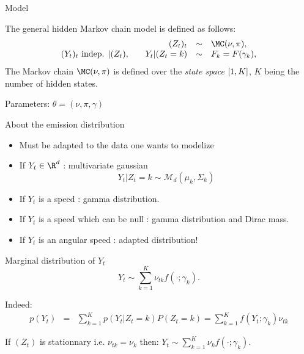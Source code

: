 \documentclass[compress,10pt]{beamer}
\begin{document}
\begin{frame}{Model}
 

\begin{definition} \label{Def:HMM}
  The general hidden Markov chain model is defined as follows:
  \begin{equation} \label{Eq:HMM}
  \begin{array}{rcrcl}
  & & (Z_t)_t & \sim & \MC(\nu, \pi),
  \\
  (Y_t)_t \text{ indep. } | (Z_t), & &
  Y_t | (Z_t = k) & \sim & F_k = F(\gamma_k),
  \end{array}
  \end{equation}
  The Markov chain $\MC(\nu, \pi)$ is defined over the {\sl state space} $\interval{1}{K}$, $K$ being the number of hidden states. 
\end{definition}


\textcolor{dgreen}{Parameters}: $\theta = (\nu, \pi, \gamma)$
\end{frame}



\begin{frame}{About the emission distribution}
\begin{itemize}
 \item Must be adapted to the data one wants to modelize
 \item If $Y_t \in \R^d$ : multivariate gaussian 
 $$Y_t | Z_t = k \sim \mathcal{M}_d(\mu_k, \Sigma_k)$$
 \item If $Y_t$ is a speed : gamma distribution. 
 \item If $Y_t$ is a speed which can be null : gamma distribution and Dirac mass.
 \item If $Y_t$ is an angular speed : adapted distribution! 
\end{itemize}


 
\end{frame}
 

\begin{frame}{Marginal distribution of $Y_t$}
$$
Y_t \sim \sum_{k=1}^K \nu_{tk} f(\cdot; \gamma_k).
$$

Indeed: 
 \begin{eqnarray*}
  p(Y_t ) &=& \sum_{k=1}^K p(Y_t | Z_t=k) P(Z_t = k)= \sum_{k=1}^K f(Y_t; \gamma_k) \nu_{tk}
 \end{eqnarray*}

If $(Z_t)$ is stationnary i.e. $\nu_{tk} = \nu_k$ then: 
$
Y_t \sim \sum_{k=1}^K \nu_{k} f(\cdot; \gamma_k).
$





\end{frame}
\end{document}
